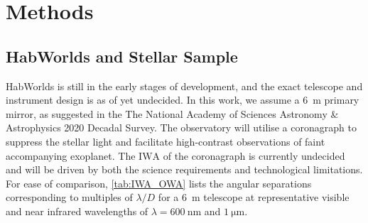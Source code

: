 \documentclass[
    usenatbib,
]{mnras}
\newcommand{\IWA}{\ensuremath{\mathrm{IWA}}}
\newcommand{\hwo}{HabWorlds}
\begin{document}

\section{Methods}


\subsection{\hwo{} and Stellar Sample}
\hwo{} is still in the early stages of development, and the exact telescope and instrument design is as of yet undecided. 
%
In this work, we assume a \SI{6}{\meter} primary mirror, as suggested in the The National Academy of Sciences Astronomy \& Astrophysics 2020 Decadal Survey.
%
The observatory will utilise a coronagraph to suppress the stellar light and facilitate high-contrast observations of faint accompanying exoplanet. 
%
The \IWA{} of the coronagraph is currently undecided and will be driven by both the science requirements and technological limitations. 
For ease of comparison, \cref{tab:IWA_OWA} lists the angular separations corresponding to multiples of $\lambda / D$ for a \SI{6}{\meter} telescope at representative visible and near infrared wavelengths of $\lambda = \SI{600}{\nano\meter}$ and $\SI{1}{\micro\meter}$.
 
\end{document}
